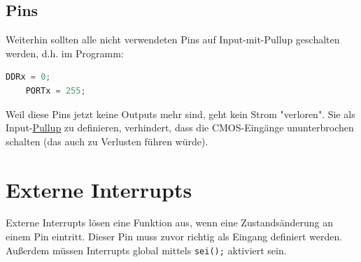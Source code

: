 \subsection{Pins}
Weiterhin sollten alle nicht verwendeten Pins auf Input-mit-Pullup geschalten werden, d.h. im Programm:
\begin{lstlisting}[language=C]
    DDRx = 0;
    PORTx = 255;
\end{lstlisting}
Weil diese Pins jetzt keine Outputs mehr sind, geht kein Strom "verloren". Sie als Input-\underline{Pullup} zu definieren, verhindert, dass die CMOS-Eingänge ununterbrochen schalten (das auch zu Verlusten führen würde).

\section{Externe Interrupts}
Externe Interrupts lösen eine Funktion aus, wenn eine Zustandsänderung an einem Pin eintritt. Dieser Pin muss zuvor richtig als Eingang  definiert werden. Außerdem müssen Interrupts global mittels \verb|sei();| aktiviert sein. \\

